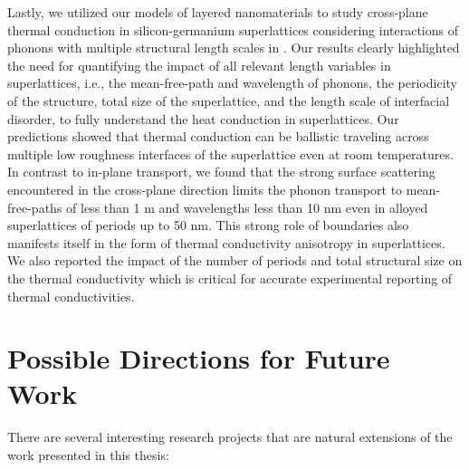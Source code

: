 \par Lastly, we utilized our models of layered nanomaterials to study cross-plane thermal conduction in silicon-germanium superlattices considering interactions of phonons with multiple structural length scales in . Our results clearly highlighted the need for quantifying the impact of all relevant length variables in superlattices, i.e., the mean-free-path and wavelength of phonons, the periodicity of the structure, total size of the superlattice, and the length scale of interfacial disorder, to fully understand the heat conduction in superlattices. Our predictions showed that thermal conduction can be ballistic traveling across multiple low roughness interfaces of the superlattice even at room temperatures. In contrast to in-plane transport, we found that the strong surface scattering encountered in the cross-plane direction limits the phonon transport to mean-free-paths of less than 1 \si{\micro}m and wavelengths less than 10 nm even in alloyed superlattices of periods up to 50 nm. This strong role of boundaries also manifests itself in the form of thermal conductivity anisotropy in superlattices. We also reported the impact of the number of periods and total structural size on the thermal conductivity which is critical for accurate experimental reporting of thermal conductivities.

\section{Possible Directions for Future Work}
There are several interesting research projects that are natural extensions of the work presented in this thesis:

